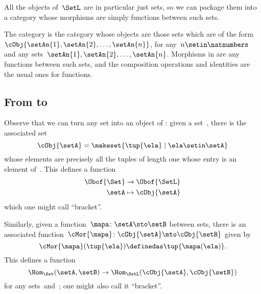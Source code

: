 
All the objects of~$\SetL$ are in particular just sets, so we can package them into a category whose morphisms are simply functions between such sets.

\begin{ctdefinition}[\SetL]\label{def:SetL}
    The category \SetL is the category whose objects are those sets which are of the form~$\cObj{\setAn{1}, \setAn{2}, \ldots, \setAn{n}}$, for any~$n \setin \natnumbers$ and any sets~$\setAn{1}, \setAn{2}, \ldots, \setAn{n}$.
    Morphisms in \SetL are any functions between such sets, and the composition operations and identities are the usual ones for functions.
\end{ctdefinition}

\subsection{From \Set to~\SetL}

Observe that we can turn any set into an object of \SetL: given a set~\setA, there is the associated set
\begin{equation}
    \label{eq:setintosetl}
    \cObj{\setA} = \makeset{ \tup{\ela} \mid \ela \setin \setA }
\end{equation}
whose elements are precisely all the tuples of length one whose entry is an element of~\setA.
This defines a function
\begin{equation}
    \label{eq:setintosetlfunction}
    \begin{aligned}
        \Obof{\Set} & \to \Obof{\SetL} \\
        \setA       & \mapsto \cObj{\setA}
    \end{aligned}
\end{equation}
which one might call ``bracket''.

Similarly, given a function~$\mapa \colon \setA \sto \setB$ between sets, there is an associated function~$\cMor{ \mapa }\colon \cObj{\setA} \mto \cObj{\setB}$ given by
\begin{equation}
    \label{eq:functionintosetlmor}
    \cMor{ \mapa } ( \tup{\ela }) \definedas \tup{\mapa(\ela)}.
\end{equation}
This defines a function
\begin{equation}
    \label{eq:functionintosetlmorfun}
    \Hom_{\Set}(\setA,\setB) \to \Hom_{\SetL}(\cObj{\setA},\cObj{\setB})
\end{equation}
for any sets~\setA and~\setB; one might also call it ``bracket''.

